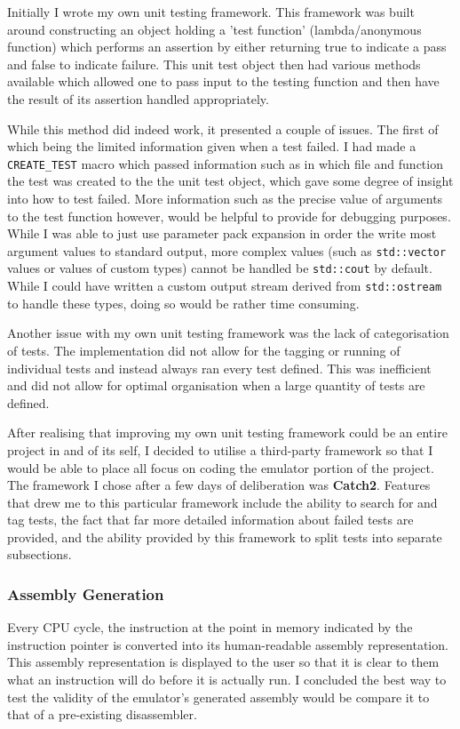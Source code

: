         Initially I wrote my own unit testing framework. This framework was built around constructing an object holding a 'test function' (lambda/anonymous function) which performs an assertion by either returning true to indicate a pass and false to indicate failure. This unit test object then had various methods available which allowed one to pass input to the testing function and then have the result of its assertion handled appropriately.

        While this method did indeed work, it presented a couple of issues. The first of which being the limited information given when a test failed. I had made a \texttt{CREATE\_TEST} macro which passed information such as in which file and function the test was created to the the unit test object, which gave some degree of insight into how to test failed. More information such as the precise value of arguments to the test function however, would be helpful to provide for debugging purposes. While I was able to just use parameter pack expansion in order the write most argument values to standard output, more complex values (such as \texttt{std::vector} values or values of custom types) cannot be handled be \texttt{std::cout} by default. While I could have written a custom output stream derived from \texttt{std::ostream} to handle these types, doing so would be rather time consuming.

        Another issue with my own unit testing framework was the lack of categorisation of tests. The implementation did not allow for the tagging or running of individual tests and instead always ran every test defined. This was inefficient and did not allow for optimal organisation when a large quantity of tests are defined.

        After realising that improving my own unit testing framework could be an entire project in and of its self, I decided to utilise a third-party framework so that I would be able to place all focus on coding the emulator portion of the project. The framework I chose after a few days of deliberation was \textbf{Catch2}. Features that drew me to this particular framework include the ability to search for and tag tests, the fact that far more detailed information about failed tests are provided, and the ability provided by this framework to split tests into separate subsections.
    \subsubsection{Assembly Generation}
        Every CPU cycle, the instruction at the point in memory indicated by the instruction pointer is converted into its human-readable assembly representation. This assembly representation is displayed to the user so that it is clear to them what an instruction will do before it is actually run. I concluded the best way to test the validity of the emulator's generated assembly would be compare it to that of a pre-existing disassembler.


